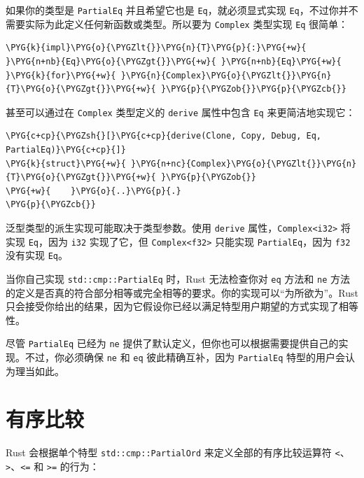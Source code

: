 如果你的类型是 \texttt{PartialEq} 并且希望它也是 \texttt{Eq}，就必须显式实现 \texttt{Eq}，不过你并不需要实际为此定义任何新函数或类型。所以要为 \texttt{Complex} 类型实现 \texttt{Eq} 很简单：

\begin{Verbatim}[commandchars=\\\{\},breaklines=true,breakanywhere=true,fontsize=\codefont,xleftmargin=17bp]
\PYG{k}{impl}\PYG{o}{\PYGZlt{}}\PYG{n}{T}\PYG{p}{:}\PYG{+w}{ }\PYG{n+nb}{Eq}\PYG{o}{\PYGZgt{}}\PYG{+w}{ }\PYG{n+nb}{Eq}\PYG{+w}{ }\PYG{k}{for}\PYG{+w}{ }\PYG{n}{Complex}\PYG{o}{\PYGZlt{}}\PYG{n}{T}\PYG{o}{\PYGZgt{}}\PYG{+w}{ }\PYG{p}{\PYGZob{}}\PYG{p}{\PYGZcb{}}
\end{Verbatim}

甚至可以通过在 \texttt{Complex} 类型定义的 \texttt{derive} 属性中包含 \texttt{Eq} 来更简洁地实现它：

\begin{Verbatim}[commandchars=\\\{\},breaklines=true,breakanywhere=true,fontsize=\codefont,xleftmargin=17bp]
\PYG{c+cp}{\PYGZsh{}[}\PYG{c+cp}{derive(Clone, Copy, Debug, Eq, PartialEq)}\PYG{c+cp}{]}
\PYG{k}{struct}\PYG{+w}{ }\PYG{n+nc}{Complex}\PYG{o}{\PYGZlt{}}\PYG{n}{T}\PYG{o}{\PYGZgt{}}\PYG{+w}{ }\PYG{p}{\PYGZob{}}
\PYG{+w}{    }\PYG{o}{..}\PYG{p}{.}
\PYG{p}{\PYGZcb{}}
\end{Verbatim}

泛型类型的派生实现可能取决于类型参数。使用 \texttt{derive} 属性，\texttt{Complex<i32>} 将实现 \texttt{Eq}，因为 \texttt{i32} 实现了它，但 \texttt{Complex<f32>} 只能实现 \texttt{PartialEq}，因为 \texttt{f32} 没有实现 \texttt{Eq}。

当你自己实现 \texttt{std::cmp::PartialEq} 时，Rust 无法检查你对 \texttt{eq} 方法和 \texttt{ne} 方法的定义是否真的符合部分相等或完全相等的要求。你的实现可以“为所欲为”。Rust 只会接受你给出的结果，因为它假设你已经以满足特型用户期望的方式实现了相等性。

尽管 \texttt{PartialEq} 已经为 \texttt{ne} 提供了默认定义，但你也可以根据需要提供自己的实现。不过，你必须确保 \texttt{ne} 和 \texttt{eq} 彼此精确互补，因为 \texttt{PartialEq} 特型的用户会认为理当如此。

\section{有序比较}

Rust 会根据单个特型 \texttt{std::cmp::PartialOrd} 来定义全部的有序比较运算符 \texttt{<}、\texttt{>}、\texttt{<=} 和 \texttt{>=} 的行为：

